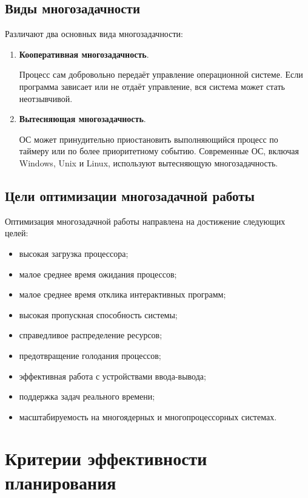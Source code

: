 \documentclass[12pt,a4paper]{article}
\begin{document}
\subsection{Виды многозадачности}

Различают два основных вида многозадачности:

\begin{enumerate}
    \item \textbf{Кооперативная многозадачность}.

    Процесс сам добровольно передаёт управление операционной системе. Если программа зависает или не отдаёт управление, вся система может стать неотзывчивой.

    \item \textbf{Вытесняющая многозадачность}.

    ОС может принудительно приостановить выполняющийся процесс по таймеру или по более приоритетному событию. Современные ОС, включая Windows, Unix и Linux, используют вытесняющую многозадачность.
\end{enumerate}

\subsection{Цели оптимизации многозадачной работы}

Оптимизация многозадачной работы направлена на достижение следующих целей:

\begin{itemize}
    \item высокая загрузка процессора;
    \item малое среднее время ожидания процессов;
    \item малое среднее время отклика интерактивных программ;
    \item высокая пропускная способность системы;
    \item справедливое распределение ресурсов;
    \item предотвращение голодания процессов;
    \item эффективная работа с устройствами ввода-вывода;
    \item поддержка задач реального времени;
    \item масштабируемость на многоядерных и многопроцессорных системах.
\end{itemize}

\section{Критерии эффективности планирования}
\end{document}
